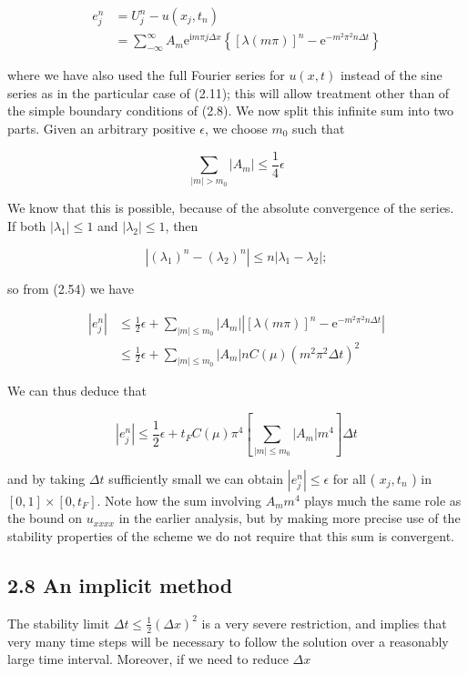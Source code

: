 \documentclass[10pt]{article}
\begin{document}
\[
\begin{aligned}
e_{j}^{n} & =U_{j}^{n}-u\left(x_{j}, t_{n}\right) \\
& =\sum_{-\infty}^{\infty} A_{m} \mathrm{e}^{\mathrm{i} m \pi j \Delta x}\left\{[\lambda(m \pi)]^{n}-\mathrm{e}^{-m^{2} \pi^{2} n \Delta t}\right\}
\end{aligned}
\]

where we have also used the full Fourier series for \(u(x, t)\) instead of the sine series as in the particular case of (2.11); this will allow treatment other than of the simple boundary conditions of (2.8). We now split this infinite sum into two parts. Given an arbitrary positive \(\epsilon\), we choose \(m_{0}\) such that

\[
\sum_{|m|>m_{0}}\left|A_{m}\right| \leq \frac{1}{4} \epsilon
\]

We know that this is possible, because of the absolute convergence of the series. If both \(\left|\lambda_{1}\right| \leq 1\) and \(\left|\lambda_{2}\right| \leq 1\), then

\[
\left|\left(\lambda_{1}\right)^{n}-\left(\lambda_{2}\right)^{n}\right| \leq n\left|\lambda_{1}-\lambda_{2}\right| ;
\]

so from (2.54) we have

\[
\begin{aligned}
\left|e_{j}^{n}\right| & \leq \frac{1}{2} \epsilon+\sum_{|m| \leq m_{0}}\left|A_{m}\right|\left|[\lambda(m \pi)]^{n}-\mathrm{e}^{-m^{2} \pi^{2} n \Delta t}\right| \\
& \leq \frac{1}{2} \epsilon+\sum_{|m| \leq m_{0}}\left|A_{m}\right| n C(\mu)\left(m^{2} \pi^{2} \Delta t\right)^{2}
\end{aligned}
\]

We can thus deduce that

\[
\left|e_{j}^{n}\right| \leq \frac{1}{2} \epsilon+t_{F} C(\mu) \pi^{4}\left[\sum_{|m| \leq m_{0}}\left|A_{m}\right| m^{4}\right] \Delta t
\]

and by taking \(\Delta t\) sufficiently small we can obtain \(\left|e_{j}^{n}\right| \leq \epsilon\) for all ( \(x_{j}, t_{n}\) ) in \([0,1] \times\left[0, t_{F}\right]\). Note how the sum involving \(A_{m} m^{4}\) plays much the same role as the bound on \(u_{x x x x}\) in the earlier analysis, but by making more precise use of the stability properties of the scheme we do not require that this sum is convergent.

\subsection*{2.8 An implicit method}
The stability limit \(\Delta t \leq \frac{1}{2}(\Delta x)^{2}\) is a very severe restriction, and implies that very many time steps will be necessary to follow the solution over a reasonably large time interval. Moreover, if we need to reduce \(\Delta x\)
\end{document}
